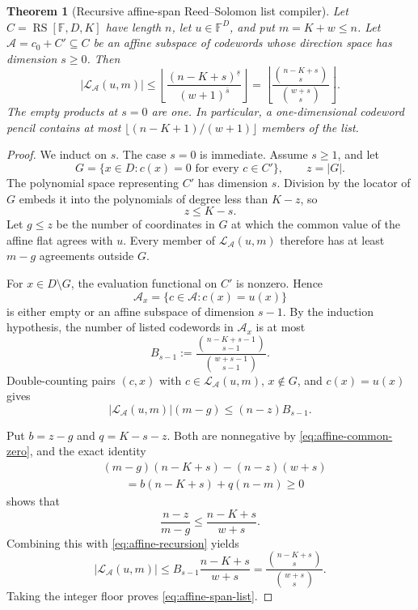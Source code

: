 \documentclass[11pt,a4paper]{amsart}
\numberwithin{equation}{section}
\newtheorem{theorem}{Theorem}[section]
\theoremstyle{remark}
\DeclareMathOperator{\RS}{RS}\DeclareMathOperator{\MCA}{MCA}\DeclareMathOperator{\CA}{CA}
\newcommand{\F}{\mathbb F}\newcommand{\B}{\mathbb B}\newcommand{\K}{\mathbb K}\newcommand{\Z}{\mathbb Z}
\begin{document}
\begin{theorem}[Recursive affine-span Reed--Solomon list compiler]
\label{thm:affine-span-list}
Let \(C=\RS[\F,D,K]\) have length \(n\), let \(u\in\F^D\), and put
\(m=K+w\le n\).  Let \(\mathcal A=c_0+C'\subseteq C\) be an affine
subspace of codewords whose direction space has dimension \(s\ge0\).  Then
\begin{equation}
 |\mathcal L_{\mathcal A}(u,m)|
 \le
 \left\lfloor
 \frac{(n-K+s)^{\underline s}}
      {(w+1)^{\overline s}}
 \right\rfloor
 =
 \left\lfloor
 \frac{\binom{n-K+s}{s}}
      {\binom{w+s}{s}}
 \right\rfloor .
 \label{eq:affine-span-list}
\end{equation}
The empty products at \(s=0\) are one.  In particular, a one-dimensional
codeword pencil contains at most
\(\lfloor(n-K+1)/(w+1)\rfloor\) members of the list.
\end{theorem}

\begin{proof}
We induct on \(s\).  The case \(s=0\) is immediate.  Assume \(s\ge1\),
and let
\[
 G=\{x\in D:c(x)=0\text{ for every }c\in C'\},
 \qquad z=|G|.
\]
The polynomial space representing \(C'\) has dimension \(s\).  Division
by the locator of \(G\) embeds it into the polynomials of degree less than
\(K-z\), so
\begin{equation}
                         z\le K-s.                 \label{eq:affine-common-zero}
\end{equation}
Let \(g\le z\) be the number of coordinates in \(G\) at which the common
value of the affine flat agrees with \(u\).  Every member of
\(\mathcal L_{\mathcal A}(u,m)\) therefore has at least \(m-g\)
agreements outside \(G\).

For \(x\in D\setminus G\), the evaluation functional on \(C'\) is
nonzero.  Hence
\[
 \mathcal A_x=\{c\in\mathcal A:c(x)=u(x)\}
\]
is either empty or an affine subspace of dimension \(s-1\).  By the
induction hypothesis, the number of listed codewords in \(\mathcal A_x\)
is at most
\[
 B_{s-1}:=
 \frac{\binom{n-K+s-1}{s-1}}
      {\binom{w+s-1}{s-1}}.
\]
Double-counting pairs \((c,x)\) with
\(c\in\mathcal L_{\mathcal A}(u,m)\), \(x\notin G\), and \(c(x)=u(x)\)
gives
\begin{equation}
 |\mathcal L_{\mathcal A}(u,m)|(m-g)
 \le (n-z)B_{s-1}.                                \label{eq:affine-recursion}
\end{equation}

Put \(b=z-g\) and \(q=K-s-z\).  Both are nonnegative by
\eqref{eq:affine-common-zero}, and the exact identity
\begin{equation}
 \begin{split}
 &(m-g)(n-K+s)-(n-z)(w+s)\\
 &\qquad=b(n-K+s)+q(n-m)\ge0
 \end{split}                                      \label{eq:affine-ratio-identity}
\end{equation}
shows that
\[
 \frac{n-z}{m-g}\le\frac{n-K+s}{w+s}.
\]
Combining this with \eqref{eq:affine-recursion} yields
\[
 |\mathcal L_{\mathcal A}(u,m)|
 \le B_{s-1}\frac{n-K+s}{w+s}
 =\frac{\binom{n-K+s}{s}}{\binom{w+s}{s}}.
\]
Taking the integer floor proves \eqref{eq:affine-span-list}.
\end{proof}
\end{document}

